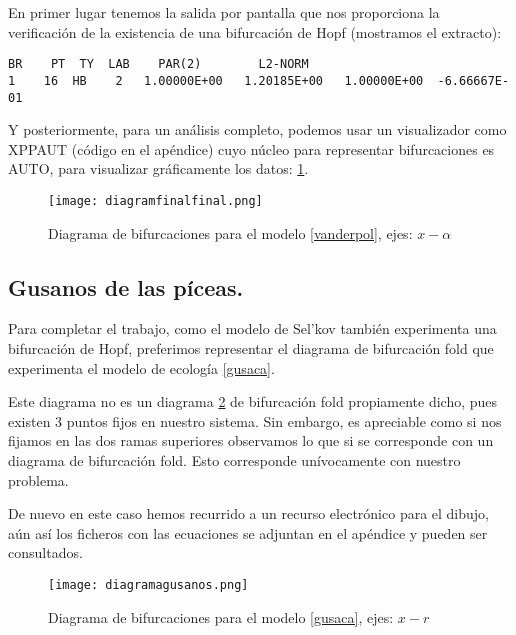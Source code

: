 En primer lugar tenemos la salida por pantalla que nos proporciona la verificación de la existencia de una bifurcación de Hopf (mostramos el extracto):

\begin{lstlisting}
BR    PT  TY  LAB    PAR(2)        L2-NORM         
1    16  HB    2   1.00000E+00   1.20185E+00   1.00000E+00  -6.66667E-01
\end{lstlisting}

Y posteriormente, para un análisis completo, podemos usar un visualizador como XPPAUT (código en el apéndice) cuyo núcleo para representar bifurcaciones es AUTO, para visualizar gráficamente los datos: \ref{vandedia}.


 \begin{figure}[h]
 	\texttt{[image: diagramfinalfinal.png]}
 	\caption{Diagrama de bifurcaciones para el modelo \ref{vanderpol}, ejes:  $x-\alpha$ }
 	\label{vandedia}
 \end{figure}

\subsection{Gusanos de las píceas.}

Para completar el trabajo, como el modelo de Sel'kov también experimenta una bifurcación de Hopf, preferimos representar el diagrama de bifurcación fold que experimenta el modelo de ecología \ref{gusaca}.

Este diagrama no es un diagrama \ref{gusacaca}  de bifurcación fold propiamente dicho, pues existen 3 puntos fijos en nuestro sistema. Sin embargo, es apreciable como si nos fijamos en las dos ramas superiores observamos lo que si se corresponde con un diagrama de bifurcación fold. Esto corresponde unívocamente con nuestro problema. 

De nuevo en este caso hemos recurrido a un recurso electrónico para el dibujo, aún así los ficheros con las ecuaciones se adjuntan en el apéndice y pueden ser consultados.

 \begin{figure}[h]
 	\texttt{[image: diagramagusanos.png]}
 	\caption{Diagrama de bifurcaciones para el modelo \ref{gusaca}, ejes: $x-r$}
 	\label{gusacaca}
 \end{figure}







